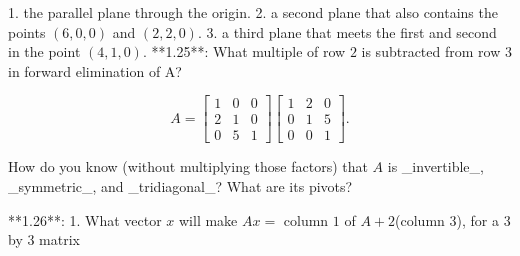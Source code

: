 1. the parallel plane through the origin. 2. a second plane that also contains the points \((6,0,0)\) and \((2,2,0)\). 3. a third plane that meets the first and second in the point \((4,1,0)\).
**1.25**: What multiple of row \(2\) is subtracted from row \(3\) in forward elimination of A?

\[A=\begin{bmatrix}1&0&0\\ 2&1&0\\ 0&5&1\end{bmatrix}\begin{bmatrix}1&2&0\\ 0&1&5\\ 0&0&1\end{bmatrix}.\]

How do you know (without multiplying those factors) that \(A\) is _invertible_, _symmetric_, and _tridiagonal_? What are its pivots?

**1.26**: 1. What vector \(x\) will make \(Ax=\) column \(1\) of \(A+2\)(column \(3\)), for a \(3\) by \(3\) matrix 